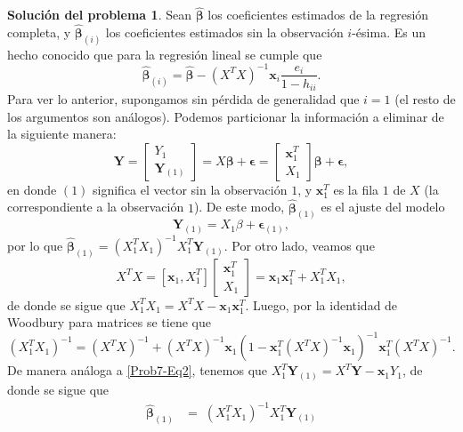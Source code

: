\documentclass[twoside,12pt]{article}
\theoremstyle{definition}
\newtheorem{soln}{Solución del problema}
\begin{document}
\newpage
\begin{soln}
Sean $\hat{\boldsymbol{\beta}}$ los coeficientes estimados de la regresión completa, y $\hat{\boldsymbol{\beta}}_{(i)}$ los coeficientes estimados sin la observación $i$-ésima. Es un hecho conocido que para la regresión lineal se cumple que
\begin{equation}\label{Prob7-Eq1}
  \hat{\boldsymbol{\beta}}_{(i)} = \hat{\boldsymbol{\beta}} - {(X^{T} X)}^{-1}\boldsymbol{x}_i \frac{e_i}{1-h_{ii}}.
\end{equation}
Para ver lo anterior, supongamos sin pérdida de generalidad que $i=1$ (el resto de los argumentos son análogos). Podemos particionar la información a eliminar de la siguiente manera:
\[
\boldsymbol{Y}=\left[ \begin{array}{c}
Y_1 \\ \boldsymbol{Y}_{(1)} \end{array} \right] =
X \boldsymbol{\beta} + \boldsymbol{\epsilon} = \left[ \begin{array}{c}
\boldsymbol{x}_1^{T} \\ X_1 \end{array} \right] \boldsymbol{\beta} + \boldsymbol{\epsilon},
\]
en donde $(1)$ significa el vector sin la observación $1$, y $\boldsymbol{x}_1^{T}$ es la fila $1$ de $X$ (la correspondiente a la observación $1$). De este modo, $\hat{\boldsymbol{\beta}}_{(1)}$ es el ajuste del modelo
\[
\boldsymbol{Y}_{(1)}=X_1\beta+\boldsymbol{\epsilon}_{(1)},
\]
por lo que $\hat{\boldsymbol{\beta}}_{(1)}=(X_1^{T}X_1)^{-1}X_1^{T}\boldsymbol{Y}_{(1)}$. Por otro lado, veamos que
\begin{equation}\label{Prob7-Eq2}
  X^{T}X=[\boldsymbol{x}_1,X_1^{T}]\left[ \begin{array}{c} \boldsymbol{x}_1^{T} \\ X_1 \end{array} \right]
= \boldsymbol{x}_1\boldsymbol{x}_1^{T}+X_1^{T}X_1,
\end{equation}
de donde se sigue que $X_1^{T}X_1=X^{T}X-\boldsymbol{x}_1\boldsymbol{x}_1^{T}$. Luego, por la identidad de Woodbury para matrices se tiene que
\[
(X_1^{T}X_1)^{-1} =
(X^{T}X)^{-1}+(X^{T}X)^{-1}\boldsymbol{x}_1(1-\boldsymbol{x}_1^{T}(X^{T}X)^{-1}\boldsymbol{x}_1)^{-1}\boldsymbol{x}_1^{T}(X^{T}X)^{-1}.
\]
De manera análoga a \eqref{Prob7-Eq2}, tenemos que $X_1^{T}\boldsymbol{Y}_{(1)} = X^{T}\boldsymbol{Y} - \boldsymbol{x}_1Y_1$, de donde se sigue que
\[
\begin{split}
\hat{\boldsymbol{\beta}}_{(1)} & = \;(X_1^{T}X_1)^{-1}X_1^{T}\boldsymbol{Y}_{(1)}\\[5pt]

\end{split}\]
\end{soln}
\end{document}
